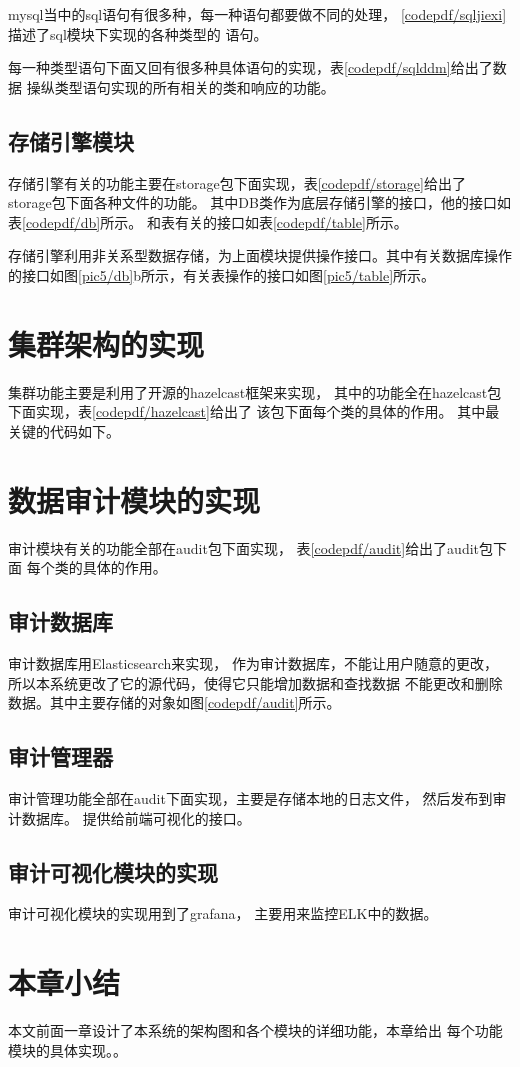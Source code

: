 mysql当中的sql语句有很多种，每一种语句都要做不同的处理，
\ref{codepdf/sqljiexi}描述了sql模块下实现的各种类型的
语句。

每一种类型语句下面又回有很多种具体语句的实现，表\ref{codepdf/sqlddm}给出了数据
操纵类型语句实现的所有相关的类和响应的功能。
\subsection{存储引擎模块}
存储引擎有关的功能主要在storage包下面实现，表\ref{codepdf/storage}给出了
storage包下面各种文件的功能。
其中DB类作为底层存储引擎的接口，他的接口如表\ref{codepdf/db}所示。
和表有关的接口如表\ref{codepdf/table}所示。

存储引擎利用非关系型数据存储，为上面模块提供操作接口。其中有关数据库操作的接口如图\ref{pic5/db}b所示，有关表操作的接口如图\ref{pic5/table}所示。
\section{集群架构的实现}
集群功能主要是利用了开源的hazelcast框架来实现，
其中的功能全在hazelcast包下面实现，表\ref{codepdf/hazelcast}给出了
该包下面每个类的具体的作用。
其中最关键的代码如下。



\section{数据审计模块的实现}
审计模块有关的功能全部在audit包下面实现，
表\ref{codepdf/audit}给出了audit包下面
每个类的具体的作用。
\subsection{审计数据库}
审计数据库用Elasticsearch来实现，
作为审计数据库，不能让用户随意的更改，
所以本系统更改了它的源代码，使得它只能增加数据和查找数据
不能更改和删除数据。其中主要存储的对象如图\ref{codepdf/audit}所示。
\subsection{审计管理器}
审计管理功能全部在audit下面实现，主要是存储本地的日志文件，
然后发布到审计数据库。
提供给前端可视化的接口。
\subsection{审计可视化模块的实现}
审计可视化模块的实现用到了grafana，
主要用来监控ELK中的数据。
\section{本章小结}
本文前面一章设计了本系统的架构图和各个模块的详细功能，本章给出
每个功能模块的具体实现。。